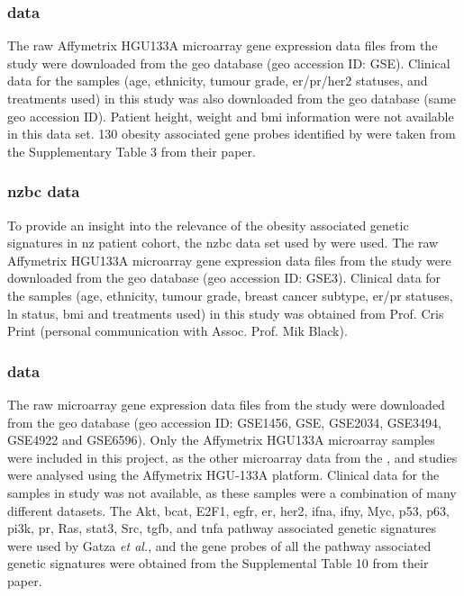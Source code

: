 \subsubsection{\citet{Fuentes-Mattei2014} data}
\label{ssub:fuentes-mattei2014_data}

The raw Affymetrix HGU\-133A microarray gene expression data files from the  \citet{Fuentes-Mattei2014} study were downloaded from the \gls{geo} database (\gls{geo} accession ID: GSE).
Clinical data for the samples (age, ethnicity, tumour grade, \gls{er}/\gls{pr}/\gls{her2} statuses, and treatments used) in this study was also downloaded from the \gls{geo} database (same \gls{geo} accession ID).
Patient height, weight and \gls{bmi} information were not available in this data set.
130 obesity associated gene probes identified by \citet{Fuentes-Mattei2014} were taken from the Supplementary Table 3 from their paper.

\subsubsection{\acrfull{nzbc} data}
\label{ssub:nzbc_data}

To provide an insight into the relevance of the obesity associated genetic signatures in \gls{nz} patient cohort, the \gls{nzbc} data set used by \citet{Print2016} were used.
The raw Affymetrix HGU133A microarray gene expression data files from the \citet{Print2016} study were downloaded from the \gls{geo} database (\gls{geo} accession ID: GSE3).
Clinical data for the samples (age, ethnicity, tumour grade, breast cancer subtype, \gls{er}/\gls{pr} statuses, \gls{ln} status, \gls{bmi} and treatments used) in this study was obtained from Prof. Cris Print (personal communication with Assoc. Prof. Mik Black).

\subsubsection{\citet{Gatza2010a} data}
\label{ssub:gatza2010a_data}

The raw microarray gene expression data files from the \citet{Gatza2010a} study were downloaded from the \gls{geo} database (\gls{geo} accession ID: GSE1456, GSE, GSE2034, GSE3494, GSE4922 and GSE6596).
Only the Affymetrix HGU\-133A microarray samples were included in this project, as the other microarray data from the \citet{Creighton2012}, \citet{Fuentes-Mattei2014} and \citet{Print2016} studies were analysed using the Affymetrix HGU-133A platform.
Clinical data for the samples in \citet{Gatza2010a} study was not available, as these samples were a combination of many different datasets.
The Akt, \gls{bcat}, E2F1, \gls{egfr}, \gls{er}, \gls{her2}, \gls{ifna}, \gls{ifny}, Myc, p53, p63, \gls{pi3k}, \gls{pr}, Ras, \gls{stat3}, Src, \gls{tgfb}, and \gls{tnfa} pathway associated genetic signatures were used by Gatza \textit{et al.}, and the gene probes of all the pathway associated genetic signatures were obtained from the Supplemental Table 10 from their paper.

